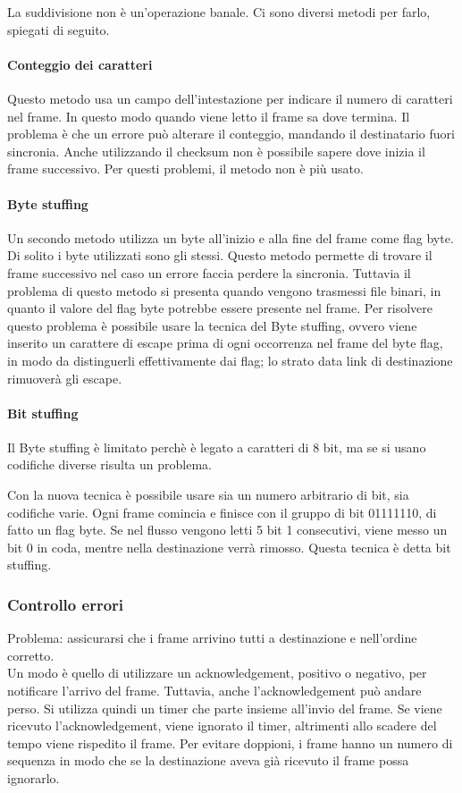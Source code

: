 La suddivisione non è un'operazione banale. Ci sono diversi metodi per farlo, spiegati di seguito.

\paragraph{Conteggio dei caratteri}
Questo metodo usa un campo dell'intestazione per indicare il numero di caratteri nel frame.
In questo modo quando viene letto il frame sa dove termina.
Il problema è che un errore può alterare il conteggio, mandando il destinatario fuori sincronia.
Anche utilizzando il checksum non è possibile sapere dove inizia il frame successivo.
Per questi problemi, il metodo non è più usato.

\paragraph{Byte stuffing}
Un secondo metodo utilizza un byte all'inizio e alla fine del frame come flag byte.
Di solito i byte utilizzati sono gli stessi.
Questo metodo permette di trovare il frame successivo nel caso un errore faccia perdere la sincronia.
Tuttavia il problema di questo metodo si presenta quando vengono trasmessi file binari, in quanto il valore del flag byte potrebbe essere presente nel frame.
Per risolvere questo problema è possibile usare la tecnica del Byte stuffing,
ovvero viene inserito un carattere di escape prima di ogni occorrenza nel frame del byte flag, in modo da distinguerli effettivamente dai flag;
lo strato data link di destinazione rimuoverà gli escape.

\paragraph{Bit stuffing}
Il Byte stuffing è limitato perchè è legato a caratteri di 8 bit, ma se si usano codifiche diverse risulta un problema.

Con la nuova tecnica è possibile usare sia un numero arbitrario di bit, sia codifiche varie.
Ogni frame comincia e finisce con il gruppo di bit 01111110, di fatto un flag byte. 
Se nel flusso vengono letti 5 bit 1 consecutivi, viene messo un bit 0 in coda, mentre nella destinazione verrà rimosso.
Questa tecnica è detta bit stuffing.

\subsubsection{Controllo errori}
Problema: assicurarsi che i frame arrivino tutti a destinazione e nell'ordine corretto.\\
Un modo è quello di utilizzare un acknowledgement, positivo o negativo, per notificare l'arrivo del frame.
Tuttavia, anche l'acknowledgement può andare perso. Si utilizza quindi un timer che parte insieme all'invio del frame.
Se viene ricevuto l'acknowledgement, viene ignorato il timer, altrimenti allo scadere del tempo viene rispedito il frame.
Per evitare doppioni, i frame hanno un numero di sequenza in modo che se la destinazione aveva già ricevuto il frame possa ignorarlo.

